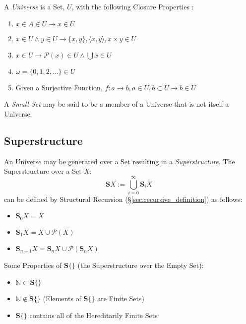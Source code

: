 A \emph{Universe} is a Set, $U$, with the following Closure Properties
\cite{maclane69}:
\begin{enumerate}
\item $x \in A \in U \rightarrow x \in U$
\item $x \in U \wedge y \in U \rightarrow \{x,y\}, \langle x,y
  \rangle, x \times y \in U$
\item $x \in U \rightarrow \mathcal{P}(x) \in U \wedge \bigcup x \in U$
\item $\omega = \{0,1,2,\ldots\} \in U$
\item Given a Surjective Function, $f : a \rightarrow b, a \in
  U, b \subset U \rightarrow b \in U$
\end{enumerate}
A \emph{Small Set} may be said to be a member of a Universe that is
not itself a Universe.



\subsection{Superstructure}\label{sec:superstructure}

An Universe may be generated over a Set resulting in a
\emph{Superstructure}. The Superstructure over a Set $X$:
\[
  \mathbf{S}X := \bigcup^{\infty}_{i=0}\mathbf{S}_i X
\]
can be defined by Structural Recursion
(\S\ref{sec:recursive_definition}) as follows:
\begin{itemize}

\item $\mathbf{S}_0 X = X$
\item $\mathbf{S}_1 X = X \cup \mathcal{P}(X)$
\item $\mathbf{S}_{n+1} X =
  \mathbf{S}_n X \cup \mathcal{P}(\mathbf{S}_n X)$

\end{itemize}
Some Properties of $\mathbf{S}\{\}$ (the Superstructure over the Empty
Set):
\begin{itemize}

\item $\mathbb{N} \subset \mathbf{S}\{\}$
\item $\mathbb{N} \notin \mathbf{S}\{\}$ (Elements of $\mathbf{S}\{\}$
  are Finite Sets)
\item $\mathbf{S}\{\}$ contains all of the Hereditarily Finite Sets

\end{itemize}

